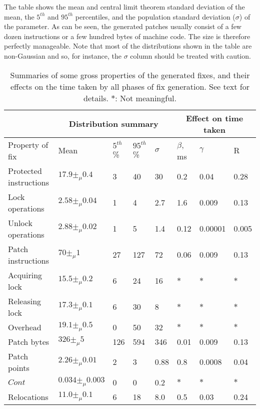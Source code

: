 The table shows the mean and central limit theorem standard deviation
of the mean, the $5^{th}$ and $95^{th}$ percentiles, and the
population standard deviation ($\sigma$) of the parameter.  As can be
seen, the generated patches usually consist of a few dozen
instructions or a few hundred bytes of machine code.  The size is
therefore perfectly manageable.  Note that most of the distributions
shown in the table are non-Gaussian and so, for instance, the $\sigma$
column should be treated with caution.

\begin{table}
  \begin{tabular}{|l|l|l|l|l|l|l|l|}
    \hline
                           & \multicolumn{4}{c|}{Distribution summary} & \multicolumn{3}{c|}{Effect on time taken} \\
    \hline
    Property of fix        & Mean & $5^{th}$\% & $95^{th}$\% & $\sigma$ & $\beta$, ms & $\gamma$ & R\\
    \hline
    Protected instructions & $17.9 \pm_\mu 0.4$  & 3   & 40  & 30  & 0.2  & 0.04 & 0.28 \\
    Lock operations        & $2.58 \pm_\mu 0.04$ & 1   & 4   & 2.7 & 1.6  & 0.009& 0.13 \\
    Unlock operations      & $2.88 \pm_\mu 0.02$ & 1   & 5   & 1.4 & 0.12 & 0.00001& 0.005 \\
    Patch instructions     & $70 \pm_\mu 1$      & 27  & 127 & 72  & 0.06 & 0.009& 0.13\\
    \hspace{5mm}Acquiring lock&$15.5 \pm_\mu 0.2$& 6   & 24  & 16  &$\ast$&$\ast$& $\ast$\\
    \hspace{5mm}Releasing lock&$17.3 \pm_\mu 0.1$& 6   & 30  & 8   &$\ast$&$\ast$& $\ast$\\
    \hspace{5mm}Overhead   & $19.1 \pm_\mu 0.5$  & 0   & 50  & 32  &$\ast$&$\ast$& $\ast$\\
    Patch bytes            & $326 \pm_\mu 5$     & 126 & 594 & 346 & 0.01 & 0.009& 0.13\\
    Patch points           & $2.26 \pm_\mu 0.01$ & 2   & 3   & 0.88& 0.8  & 0.0008& 0.04\\
    $\mathit{Cont}$        &$0.034 \pm_\mu 0.003$& 0   & 0   & 0.2 &$\ast$&$\ast$& $\ast$\\
    Relocations            & $11.0 \pm_\mu 0.1$  & 6   & 18  & 8.0 & 0.5  & 0.03 & 0.24\\
    \hline
  \end{tabular}
  \caption{Summaries of some gross properties of the generated fixes,
    and their effects on the time taken by all phases of fix
    generation.  See text for details. $\ast$: Not meaningful.}
  \label{tab:eval:gen_fix_perf:props}
\end{table}

